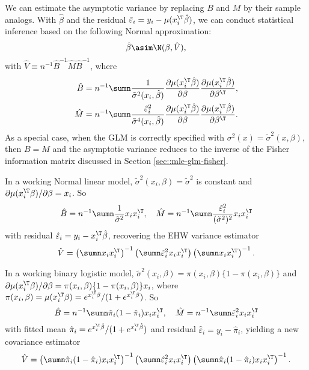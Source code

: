  


We can estimate the asymptotic variance by replacing $B$ and $M$
by their sample analogs.
With $\hat\beta$ and the residual $\hat{\varepsilon}_i = y_{i}-\mu(x_{i}^{\T}\hat{\beta} ) $, we can conduct statistical inference based on the following Normal approximation:
\[
\hat{\beta}\asim\N(\beta,\hat{V}),
\]
with $\hat{V} \equiv n^{-1}\hat{B}^{-1}\hat{M}\hat{B}^{-1}$, 
where 
\begin{align*}
\hat{B} & =n^{-1}\sumn\frac{1}{\tilde{\sigma}^{2}(x_{i}, \hat{\beta})}\frac{\partial\mu(x_{i}^{\T}\hat{\beta})}{\partial\beta}\frac{\partial\mu(x_{i}^{\T}\hat{\beta})}{\partial\beta^{\T}},\\
\hat{M} & =n^{-1}\sumn \frac{ \hat{\varepsilon}_i^2    }{\tilde{\sigma}^{4}(x_{i}, \hat{\beta})} \frac{\partial\mu(x_{i}^{\T}\hat{\beta})}{\partial\beta}\frac{\partial\mu(x_{i}^{\T}\hat{\beta})}{\partial\beta^{\T}}.
\end{align*}
As a special case, when the GLM is correctly specified with $\sigma^2(x) = \tilde{\sigma}^2(x, \beta)$, then $B=M$ and the asymptotic variance reduces to the inverse of the Fisher information matrix discussed in Section \ref{sec::mle-glm-fisher}. 



\setcounter{example}{0}
\begin{example}[continued]\label{eg::gaussianlinearmodel-continue2}
In a working Normal linear model,   $\tilde{\sigma}^2(x_i, \beta)  = \tilde{\sigma}^2$ is constant and 
$  \partial\mu(x_{i}^{\T} \beta ) / \partial\beta  = x_i$. So
$$
\hat{B} = n^{-1}\sumn\frac{1}{\tilde{\sigma}^{2} } x_i x_i^{\T},\quad
\hat{M} = n^{-1}\sumn  \frac{   \hat{\varepsilon}_i^2 }{  (\tilde{\sigma}^{2})^2 }  x_i x_i^{\T}
$$
with residual $ \hat{\varepsilon}_i  = y_i - x_i^{\T} \hat{\beta}$, recovering the EHW variance estimator
$$
\hat{V} = \left( \sumn   x_i x_i^{\T} \right)^{-1}
\left(\sumn \hat{\varepsilon}_i^2 x_i x_i^{\T} \right)
 \left( \sumn x_i x_i^{\T} \right)^{-1} . 
$$
\end{example}



\begin{example}[continued]\label{eg::binarylogisticmodel-continue2}
In a working binary logistic model, $\tilde{\sigma}^2(x_i, \beta)  = \pi(x_i, \beta) \{1-\pi(x_i, \beta) \} $ and $ \partial\mu(x_{i}^{\T} \beta ) / \partial\beta  = \pi(x_i, \beta) \{1-\pi(x_i, \beta)\} x_i$, where $\pi(x_i, \beta)  = \mu(x_i^{\T} \beta) = e^{x_i^{\T} \beta}  / (1 +e^{x_i^{\T} \beta} )$. So
$$
\hat{B} = n^{-1}\sumn \hat{\pi}_i (1-\hat{\pi}_i )  x_i x_i^{\T},\quad
\hat{M} = n^{-1}\sumn  \hat{\varepsilon}_i^2   x_i x_i^{\T}
$$
with fitted mean $\hat{\pi}_i = e^{x_i^{\T}  \hat{\beta}}  / (1 +e^{x_i^{\T}  \hat{\beta}} )  $ and residual $ \hat{\varepsilon}_i  = y_i - \hat{\pi}_i$, yielding a new covariance estimator
$$
\hat{V} = \left( \sumn \hat{\pi}_i (1-\hat{\pi}_i )   x_i x_i^{\T} \right)^{-1}
\left(\sumn \hat{\varepsilon}_i^2 x_i x_i^{\T} \right)
 \left( \sumn  \hat{\pi}_i (1-\hat{\pi}_i )   x_i x_i^{\T} \right)^{-1} . 
$$
\end{example}


